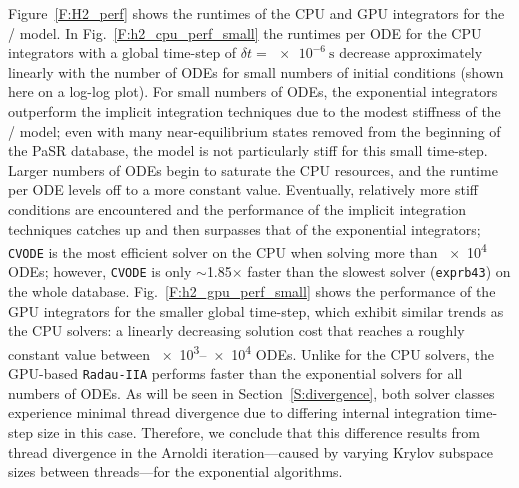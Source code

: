 \documentclass[preprint]{elsarticle}
\begin{document}
Figure~\ref{F:H2_perf} shows the runtimes of the CPU and GPU integrators for the \slash{} model.
In Fig.~\ref{F:h2_cpu_perf_small} the runtimes per ODE for the CPU integrators with a global time-step of $\delta t= \SI{e-6}{\second}$ decrease approximately linearly with the number of ODEs for small numbers of initial conditions (shown here on a log-log plot).
For small numbers of ODEs, the exponential integrators outperform the implicit integration techniques due to the modest stiffness of the \slash{} model; even with many near-equilibrium states removed from the beginning of the PaSR database, the model is not particularly stiff for this small time-step.
Larger numbers of ODEs begin to saturate the CPU resources, and the runtime per ODE levels off to a more constant value.
Eventually, relatively more stiff conditions are encountered and the performance of the implicit integration techniques catches up and then surpasses that of the exponential integrators; \texttt{CVODE} is the most efficient solver on the CPU when solving more than \num{e4} ODEs; however, \texttt{CVODE} is only $\sim$\num{1.85}$\times$ faster than the slowest solver (\texttt{exprb43}) on the whole database.
Fig.~\ref{F:h2_gpu_perf_small} shows the performance of the GPU integrators for the smaller global time-step, which exhibit similar trends as the CPU solvers: a linearly decreasing solution cost that reaches a roughly constant value between \numrange{e3}{e4} ODEs.
Unlike for the CPU solvers, the GPU-based \texttt{Radau-IIA} performs faster than the exponential solvers for all numbers of ODEs.
As will be seen in Section~\ref{S:divergence}, both solver classes experience minimal thread divergence due to differing internal integration time-step size in this case.
Therefore, we conclude that this difference results from thread divergence in the Arnoldi iteration---caused by varying Krylov subspace sizes between threads---for the exponential algorithms.
\end{document}
